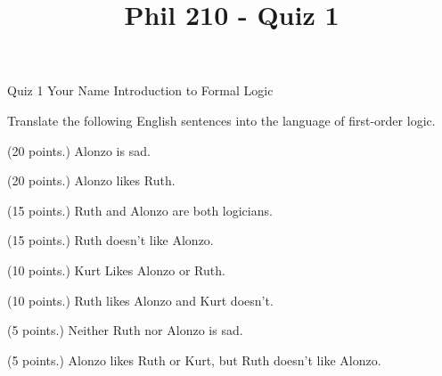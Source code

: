 
\title{Phil 210 - Quiz 1}

\heading
Quiz 1
Your Name
Introduction to Formal Logic
\endheading

Translate the following English sentences into the language of first-order logic.

\problems
{} (20 points.)
Alonzo is sad.
        \answer
        $ $
        \endanswer

 (20 points.)
Alonzo likes Ruth.
        \answer
        $ $
        \endanswer

 (15 points.)
Ruth and Alonzo are both logicians.
        \answer
        $ $
        \endanswer

 (15 points.)
Ruth doesn't like Alonzo.
        \answer
        $ $
        \endanswer

 (10 points.)
Kurt Likes Alonzo or Ruth.
        \answer
        $ $
        \endanswer

 (10 points.)
Ruth likes Alonzo and Kurt doesn't.
        \answer
        $ $
        \endanswer

 (5 points.)
Neither Ruth nor Alonzo is sad.
        \answer
        $ $
        \endanswer

 (5 points.)
Alonzo likes Ruth or Kurt, but Ruth doesn't like Alonzo.
        \answer
        $ $
        \endanswer

\endproblems
\bye
